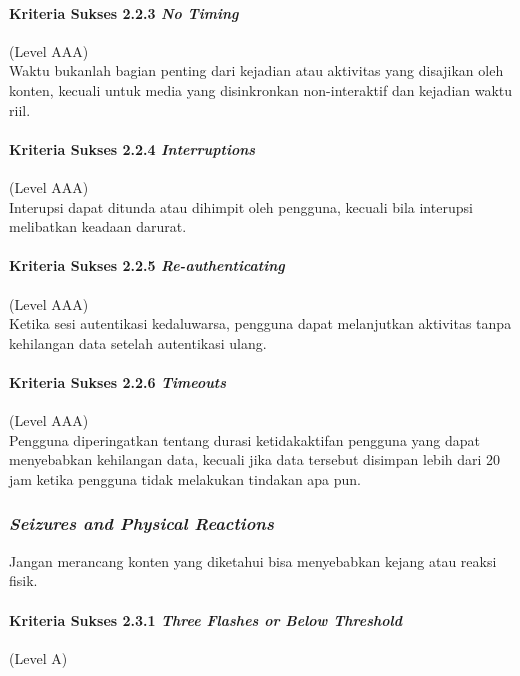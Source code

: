 \paragraph{Kriteria Sukses 2.2.3 \textit{No Timing}}
\label{sec:kriteria_sukses_2.2.3}
(Level AAA)\\

Waktu bukanlah bagian penting dari kejadian atau aktivitas yang disajikan oleh konten, kecuali untuk media yang disinkronkan non-interaktif dan kejadian waktu riil.

\paragraph{Kriteria Sukses 2.2.4 \textit{Interruptions}}
\label{sec:kriteria_sukses_2.2.4}
(Level AAA)\\

Interupsi dapat ditunda atau dihimpit oleh pengguna, kecuali bila interupsi melibatkan keadaan darurat.

\paragraph{Kriteria Sukses 2.2.5 \textit{Re-authenticating}}
\label{sec:kriteria_sukses_2.2.5}
(Level AAA)\\

Ketika sesi autentikasi kedaluwarsa, pengguna dapat melanjutkan aktivitas tanpa kehilangan data setelah autentikasi ulang.

\paragraph{Kriteria Sukses 2.2.6 \textit{Timeouts}}
\label{sec:kriteria_sukses_2.2.6}
(Level AAA)\\

Pengguna diperingatkan tentang durasi ketidakaktifan pengguna yang dapat menyebabkan kehilangan data, kecuali jika data tersebut disimpan lebih dari 20 jam ketika pengguna tidak melakukan tindakan apa pun.

\subsubsection{\textit{Seizures and Physical Reactions}}
\label{sec:seizures_and_physical_reactions}
Jangan merancang konten yang diketahui bisa menyebabkan kejang atau reaksi fisik.

\paragraph{Kriteria Sukses 2.3.1 \textit{Three Flashes or Below Threshold}}
\label{sec:kriteria_sukses_2.3.1}
(Level A)\\


